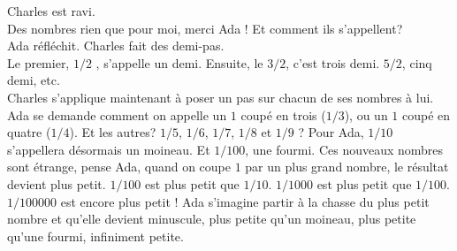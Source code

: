 Charles est ravi.\\
\guillemotleft Des nombres rien que pour moi, merci Ada ! Et comment ils s’appellent? \guillemotright \\
Ada réfléchit. Charles fait des demi-pas. \\
\guillemotleft Le premier, $1/2$ , s’appelle un demi. Ensuite, le $3/2$, c’est trois demi. $5/2$, cinq demi, etc. \guillemotright \\
Charles s’applique maintenant à poser un pas sur chacun de ses nombres à lui.
Ada se demande comment on appelle un $1$ coupé en trois ($1/3$), ou un $1$ coupé en quatre ($1/4$). Et les autres? $1/5$, $1/6$, $1/7$, $1/8$ et $1/9$ ? Pour Ada, $1/10$ s’appellera désormais un moineau. Et $1/100$, une fourmi. 
Ces nouveaux nombres sont étrange, pense Ada, quand on coupe $1$ par un plus grand nombre, le résultat devient plus petit.
$1/100$ est plus petit que $1/10$. $1/1000$ est plus petit que $1/100$. $1/100000$ est encore plus petit ! Ada s’imagine partir à la chasse du plus petit nombre et qu'elle devient minuscule, plus petite qu’un moineau, plus petite qu'une fourmi, infiniment petite.
